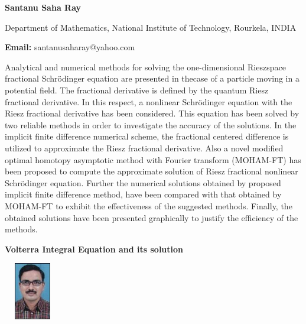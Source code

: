 \documentclass[twoside,11pt]{amsart}
\begin{document}
\vskip 5mm
\centerline{\textbf{ Santanu Saha Ray }}
\vskip 2mm
\begin{flushleft}
Department of Mathematics, National Institute of Technology, Rourkela, INDIA
\end{flushleft}
\vskip 2mm
\begin{flushleft}
{\bf Email:} santanusaharay@yahoo.com
\end{flushleft}

\vskip 8mm
Analytical and numerical methods for solving the one-dimensional Rieszspace fractional
Schr\"{o}dinger equation are presented in thecase of a particle moving in a potential field. The
fractional derivative is defined by the quantum Riesz fractional derivative. In this respect, a
nonlinear Schrödinger equation with the Riesz fractional derivative has been considered. This
equation has been solved by two reliable methods in order to investigate the accuracy of the
solutions. In the implicit finite difference numerical scheme, the fractional centered difference is
utilized to approximate the Riesz fractional derivative. Also a novel modified optimal homotopy
asymptotic method with Fourier transform (MOHAM-FT) has been proposed to compute the
approximate solution of Riesz fractional nonlinear Schrödinger equation. Further the numerical
solutions obtained by proposed implicit finite difference method, have been compared with that
obtained by MOHAM-FT to exhibit the effectiveness of the suggested methods. Finally, the
obtained solutions have been presented graphically to justify the efficiency of the methods.
\vskip 2mm
\newpage


\vskip 10mm
\begin{center}\bf\LARGE
Volterra Integral Equation and its solution
\end{center}
\vskip 5mm
\begin{center}
\includegraphics[width=2.5cm, height=2.5cm, keepaspectratio=false]{JP2.jpg}
\end{center}
\vskip 2mm
\end{document}
